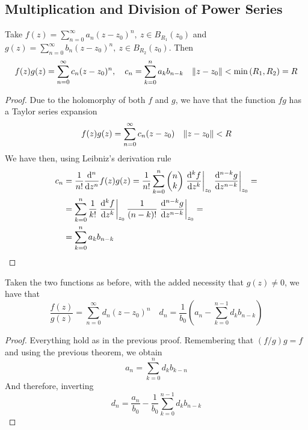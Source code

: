 \documentclass[../complete.tex]{subfiles}
\begin{document}
\subsection{Multiplication and Division of Power Series}
\begin{thm}
	Take $f(z)=\sum_{n=0}^\infty a_n(z-z_0)^n,\ z\in B_{R_1}(z_0)$ and $g(z)=\sum_{n=0}^\infty b_n(z-z_0)^n,\ z\in B_{R_2}(z_0)$. Then
	\begin{equation*}
		f(z)g(z)=\sum_{n=0}^\infty c_n(z-z_0)^n,\quad c_n=\sum_{k=0}^na_kb_{n-k}\quad \norm{z-z_0}<\min\left( R_1,R_2 \right)=R
	\end{equation*}
\end{thm}
\begin{proof}
	Due to the holomorphy of both $f$ and $g$, we have that the function $fg$ has a Taylor series expansion
	\begin{equation*}
		f(z)g(z)=\sum_{n=0}^\infty c_n(z-z_0)\quad\norm{z-z_0}<R
	\end{equation*}
	We have then, using Leibniz's derivation rule
	\begin{equation*}
		\begin{aligned}
			c_n&=\frac{1}{n!}\derivative[n]{z}f(z)g(z)=\frac{1}{n!}\sum_{k=0}^{n}\begin{pmatrix}n\\k\end{pmatrix}\left.\derivative[k]{f}{z}\right|_{z_0}\left.\derivative[n-k]{g}{z}\right|_{z_0}=\\
			&=\sum_{k=0}^{n}\frac{1}{k!}\left.\derivative[k]{f}{z}\right|_{z_0}\frac{1}{(n-k)!}\left.\derivative[n-k]{g}{z}\right|_{z_0}=\\
			&=\sum_{k=0}^na_kb_{n-k}
		\end{aligned}
	\end{equation*}
\end{proof}
\begin{thm}
	Taken the two functions as before, with the added necessity that $g(z)\ne0$, we have that
	\begin{equation*}
		\frac{f(z)}{g(z)}=\sum_{n=0}^{\infty}d_n(z-z_0)^n\quad d_n=\frac{1}{b_0}\left( a_n-\sum_{k=0}^{n-1}d_kb_{n-k} \right)
	\end{equation*}
\end{thm}
\begin{proof}
	Everything hold as in the previous proof. Remembering that $(f/g)g=f$ and using the previous theorem, we obtain
	\begin{equation*}
		a_n=\sum_{k=0}^{n}d_kb_{k-n}
	\end{equation*}
	And therefore, inverting
	\begin{equation*}
		d_n=\frac{a_n}{b_0}-\frac{1}{b_0}\sum_{k=0}^{n-1}d_kb_{n-k}
	\end{equation*}
\end{proof}
\end{document}
